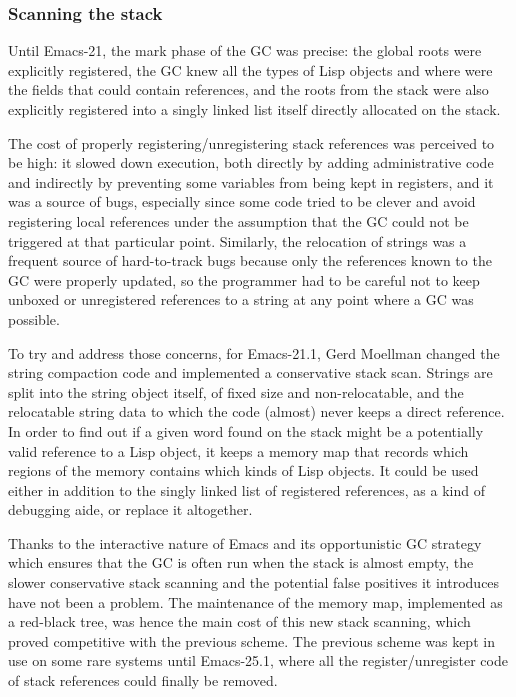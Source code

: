 \documentclass[format=acmsmall, review=false, screen=true]{acmart}
\begin{document}
\subsubsection{Scanning the stack}
Until Emacs-21, the mark phase of the GC was precise: the global roots were
explicitly registered, the GC knew all the types of Lisp objects and where
were the fields that could contain references, and the roots from the stack
were also explicitly registered into a singly linked list itself directly
allocated on the stack.

The cost of properly registering/unregistering stack references was
perceived to be high: it slowed down execution, both directly by adding
administrative code and indirectly by preventing some variables from being
kept in registers, and it was a source of bugs, especially since some code
tried to be clever and avoid registering local references under the
assumption that the GC could not be triggered at that particular point.
Similarly, the relocation of strings was a frequent source of hard-to-track
bugs because only the references known to the GC were properly updated, so
the programmer had to be careful not to keep unboxed or unregistered
references to a string at any point where a GC was possible.

To try and address those concerns, for Emacs-21.1, Gerd
Moellman changed the string compaction code and implemented a conservative
stack scan.  Strings are split into the string object itself, of fixed size
and non-relocatable, and the relocatable string data to which the code
(almost) never keeps a direct reference.  In order to find out if a given
word found on the stack might be a potentially valid reference to a Lisp
object, it keeps a memory map that records which regions of the memory
contains which kinds of Lisp objects.  It could be used either in addition
to the singly linked list of registered references, as a kind of debugging
aide, or replace it altogether.

Thanks to the interactive nature of Emacs and its opportunistic GC strategy
which ensures that the GC is often run when the stack is almost empty, the
slower conservative stack scanning and the potential false positives it
introduces have not been a problem.  The maintenance of the memory map,
implemented as a red-black tree, was hence the main cost of this new stack
scanning, which proved competitive with the previous scheme.  The previous
scheme was kept in use on some rare systems until Emacs-25.1, where all the
register/unregister code of stack references could finally be removed.
\end{document}
